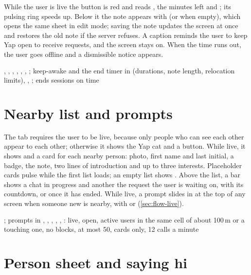 While the user is live the button is red and reads , the minutes left and ;
its pulsing ring speeds up. Below it the note appears with  (or  when empty), which opens
the same sheet in edit mode; saving the note updates the screen at once and restores the old note if the
server refuses. A caption reminds the user to keep Yap open to receive requests, and the screen stays on.
When the time runs out, the user goes offline and a dismissible  notice appears.

\implemented
  {, }
  {, , , , , ; keep-awake and the end timer in }
  { (durations, note length, relocation limits), , ;  ends sessions on time}

\section{Nearby list and prompts}
\label{sec:feature-nearby}

The  tab requires the user to be live, because only people who can see each other appear to
each other; otherwise it shows the Yap cat and a  button. While live, it shows  and a card for each nearby person: photo, first name and last initial, a  badge,
the note, two lines of introduction and up to three interests. Placeholder cards pulse while the first
list loads; an empty list shows . Above the list, a bar shows a chat in
progress and another the request the user is waiting on, with its countdown, or  once
it has ended. While live, a prompt slides in at the top of any screen when someone new is nearby, with
 or  (\cref{sec:flow-live}).

\implemented
  {; prompts in }
  {, , , , , }
  {: live, open, active users in the same cell of about 100\,m or a touching one, no blocks, at most 50, cards only, 12 calls a minute}

\section{Person sheet and saying hi}

